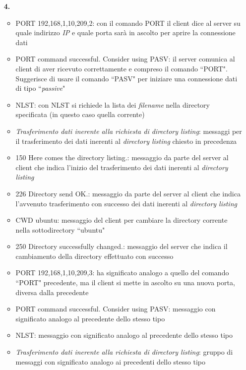 \documentclass[a4paper, 12pt]{report}
\begin{document}
\begin{enumerate}
    \item [\textbf{4.}]
        \begin{itemize}
            \item PORT 192,168,1,10,209,2: con il comando PORT il client dice al server su quale indirizzo \textit{IP} e quale porta sarà in ascolto per aprire la
            connessione dati
            \item PORT command successful. Consider using PASV: il server comunica al client di aver ricevuto correttamente e compreso il comando ``PORT".
	        Suggerisce di usare il comando ``PASV" per iniziare una connessione dati di tipo ``\textit{passive}"
            \item NLST: con NLST si richiede la lista dei \textit{filename} nella directory specificata (in questo caso quella corrente)
            \item \textit{Trasferimento dati inerente alla richiesta di directory listing}: messaggi per il trasferimento dei dati inerenti al \textit{directory listing}
            chiesto in precedenza
	        \item 150 Here comes the directory listing.: messaggio da parte del server al client che indica l'inizio del trasferimento dei dati inerenti al \textit{directory listing}
	        \item 226 Directory send OK.: messaggio da parte del server al client che indica l'avvenuto trasferimento con successo dei dati inerenti al \textit{directory listing}    
            \item CWD ubuntu: messaggio del client per cambiare la directory corrente nella sottodirectory ``ubuntu"
            \item 250 Directory successfully changed.: messaggio del server che indica il cambiamento della directory effettuato con successo
            \item PORT 192,168,1,10,209,3: ha significato analogo a quello del comando ``PORT" precedente, ma il client si mette in ascolto su una nuova porta, diversa
            dalla precedente
            \item PORT command successful. Consider using PASV: messaggio con significato analogo al precedente dello stesso tipo
            \item NLST: messaggio con significato analogo al precedente dello stesso tipo
            \item \textit{Trasferimento dati inerente alla richiesta di directory listing}: gruppo di messaggi con significato analogo ai precedenti dello stesso tipo

\end{itemize}
\end{enumerate}
\end{document}
